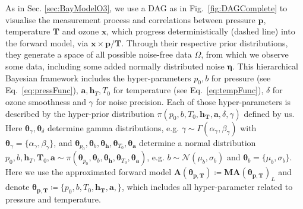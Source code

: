 As in Sec. \ref{sec:BayModelO3}, we use a DAG as in Fig.~\ref{fig:DAGComplete} to visualise the measurement process and correlations between pressure $\bm{p}$, temperature $\bm{T}$ and ozone $\bm{x}$, which progress deterministically (dashed line) into the forward model, via $\bm{x} \times \bm{p} / \bm{T}$.
Through their respective prior distributions, they generate a space of all possible noise-free data $\Omega$, from which we observe some data, including some added normally distributed noise $\bm{\eta}$.
This hierarchical Bayesian framework includes the hyper-parameters $p_0, b $ for pressure (see Eq.~\ref{eq:pressFunc}), $\bm{a}, \bm{h}_T, T_0$ for temperature (see Eq.~\ref{eq:tempFunc}), $\delta$ for ozone smoothness and $\gamma$ for noise precision.
Each of those hyper-parameters is described by the hyper-prior distribution $\pi(p_0,b,T_0,\bm{h_T},\bm{a}, \delta,\gamma)$ defined by us.
Here $\bm{\theta}_{\gamma}, \bm{\theta}_{\delta}$ determine gamma distributions, e.g. $\gamma \sim \Gamma(\alpha_{\gamma},\beta_{\gamma}) $ with $\bm{\theta}_{\gamma} = \{\alpha_{\gamma},\beta_{\gamma} \}$, and $\bm{\theta}_{p_0},\bm{\theta}_{b},\bm{\theta}_{\bm{h}},\bm{\theta}_{T_0},\bm{\theta}_{\bm{a}}$ determine a normal distribution $p_0, b, \bm{h}_T, \bm{T}_0, \bm{a} \sim \pi( \bm{\theta}_{p_0},\bm{\theta}_{b},\bm{\theta}_{\bm{h}},\bm{\theta}_{T_0},\bm{\theta}_{\bm{a}})$, e.g. $b \sim \mathcal{N}(\mu_b, \sigma_b)$ and $\bm{\theta}_{b} = \{\mu_b, \sigma_b\}$.
Here we use the approximated forward model $\bm{A}(\bm{\theta}_{\bm{p}, \bm{T}}) \coloneqq \bm{M}\bm{A}(\bm{\theta}_{\bm{p}, \bm{T}})_L$ and denote $\bm{\theta}_{\bm{p}, \bm{T}}  \coloneqq \{p_0,b,T_0,\bm{h_T},\bm{a} , \}$, which includes all hyper-parameter related to pressure and temperature.
